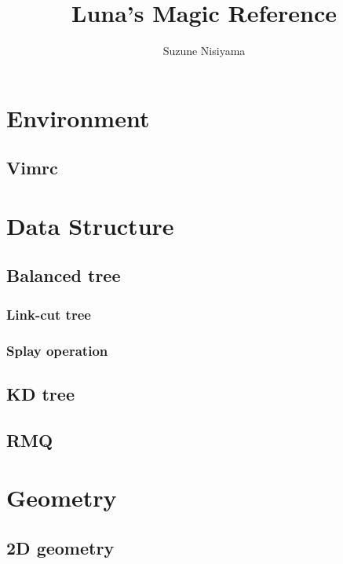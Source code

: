 \documentclass[titlepage,a4paper,10pt]{article}
\title{Luna's Magic Reference}
\author{Suzune Nisiyama}
\date{\today\\ \vspace{100pt} \noindent\rule{\textwidth}{1pt}\\ \vspace{100pt} \normalsize\begin{raggedright}\end{raggedright}}
\begin{document}
	\maketitle
	\begin{multicols}{2}
		\setcounter{tocdepth}{3}
		\begingroup
		\let\cleardoublepage\relax
		\let\clearpage\relax
		\tableofcontents
		\newpage
		\begin{spacing}{0.8}
		{\footnotesize
		\section{Environment}
			\subsection{Vimrc}
				
		\section{Data Structure}
			\subsection{Balanced tree}
				\subsubsection{Link-cut tree}
					
				\subsubsection{Splay operation}
					
			\subsection{KD tree}
				
			\subsection{RMQ}
				
		\section{Geometry}
			
			\subsection{2D geometry}
				
}
\end{spacing}
\end{multicols}
\end{document}
